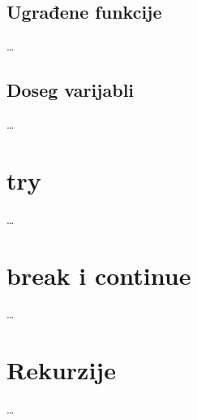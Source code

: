 \subsection{Ugrađene funkcije}

\dots

\subsection{Doseg varijabli}

\dots

\section{try}

\dots

\section{break i continue}

\dots

\section{Rekurzije}

\dots
